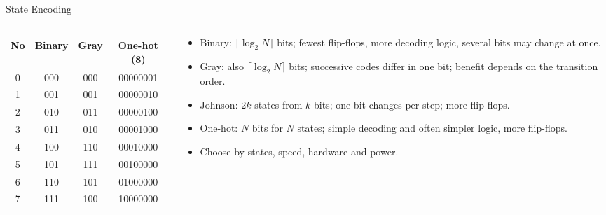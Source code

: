 \documentclass[9pt,aspectratio=169,xcolor=table]{beamer}
\newcommand{\striped}{\rowcolors{1}{white}{stripe}}
\begin{document}
\begin{frame}{State Encoding}
  \begin{columns}[c]
  \begin{column}{.45\textwidth}
    \centering\scriptsize\striped
    \begin{tabular}{@{}cccc@{}}
      \toprule
      No & Binary & Gray & One-hot (8) \\
      \midrule
      0 & 000 & 000 & 00000001 \\ 1 & 001 & 001 & 00000010 \\ 2 & 010 & 011 & 00000100 \\ 3 & 011 & 010 & 00001000 \\
      4 & 100 & 110 & 00010000 \\ 5 & 101 & 111 & 00100000 \\ 6 & 110 & 101 & 01000000 \\ 7 & 111 & 100 & 10000000 \\
      \bottomrule
    \end{tabular}
  \end{column}
  \begin{column}{.53\textwidth}
    \begin{itemize}\scriptsize\itemsep3pt
      \item \alert{Binary}: $\lceil\log_2 N\rceil$ bits; fewest flip-flops, more decoding logic, several bits may change at once.
      \item \alert{Gray}: also $\lceil\log_2 N\rceil$ bits; successive codes differ in one bit; benefit depends on the transition order.
      \item \alert{Johnson}: $2k$ states from $k$ bits; one bit changes per step; more flip-flops.
      \item \alert{One-hot}: $N$ bits for $N$ states; simple decoding and often simpler logic, more flip-flops.
      \item Choose by states, speed, hardware and power.
    \end{itemize}
  \end{column}
  \end{columns}
\end{frame}
\end{document}

